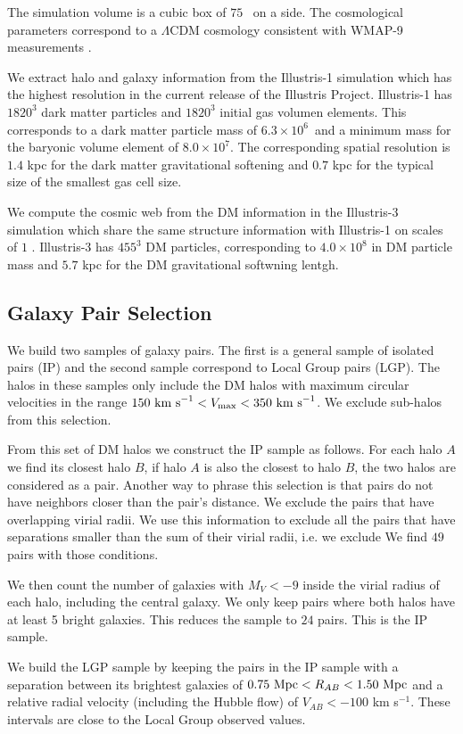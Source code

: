 \documentclass[useAMS,usenatbib,usegraphicx]{mn2e}
\newcommand{\hMpc}{{\ifmmode{h^{-1}{\rm Mpc}}\else{$h^{-1}$Mpc}\fi}}
\newcommand{\Mpc}{{\ifmmode{{\rm Mpc}}\else{Mpc}\fi}}
\newcommand{\Msun}{{\ifmmode{{\rm{M_{\odot}}}}\else{${\rm{M_{\odot}}}$}\fi}}
\newcommand{\kms}{{\ifmmode{{\rm{km\ s}^{-1}}}\else{km $\rm{s}^{-1}$}\fi}}
\begin{document}
The simulation volume is a cubic box of $75$ \hMpc\ on a side.
The cosmological parameters correspond to a $\Lambda$CDM cosmology
consistent with WMAP-9 measurements \citep{2013ApJS..208...19H}. 

We extract halo and galaxy information from the Illustris-1 simulation
which has the highest resolution in the current release of the
Illustris Project.
Illustris-1 has $1820^3$ dark matter particles and $1820^3$ initial gas
volumen elements. 
This corresponds to a dark matter particle mass of
$6.3\times 10^6$\Msun\ and a minimum mass for the baryonic volume
element of $8.0\times 10^7$\Msun. 
The corresponding spatial resolution is $1.4$ kpc for the dark matter
gravitational softening and $0.7$ kpc for the typical size of the
smallest gas cell size. 

We compute the cosmic web from the DM information in the
Illustris-3 simulation which share the same structure information with
Illustris-1 on scales of $1$ \Mpc.  
Illustris-3 has $455^3$ DM particles, corresponding to
$4.0\times 10^8$ \Msun in DM particle mass and $5.7$ kpc for the DM
gravitational softwning lentgh.
 

\subsection{Galaxy Pair Selection}

We build two samples of galaxy pairs. 
The first is a general sample of isolated pairs (IP) and the
second sample correspond to Local Group pairs (LGP).
The halos in these samples only include the DM halos with maximum
circular velocities in the range $ 150\ \kms <V_{\rm max}< 350\ \kms$. We
exclude sub-halos from this selection. 

From this set of DM halos we construct the IP sample as follows.
For each halo $A$ we find its closest halo $B$, if halo $A$ is also
the closest to halo $B$, the two halos are considered as a pair. 
Another way to phrase this selection is that pairs do not have
neighbors closer than the pair's distance.
We exclude the pairs that have overlapping virial radii. 
We use this information to exclude all the pairs that have separations
smaller than the sum of their virial radii, i.e. we exclude
We find $49$ pairs with those conditions.

We then count the number of galaxies with $M_V<-9$ inside the virial
radius of each halo, including the central galaxy.
We only keep pairs where both halos have at least 5 bright galaxies. 
This reduces the sample to $24$ pairs.  
This is the IP sample.

We build the LGP sample by keeping the pairs in the IP sample with
a separation between its brightest galaxies of $0.75\ \Mpc <R_{AB}< 1.50\ \Mpc$
and a relative radial velocity (including the Hubble flow) of $V_{AB}<-100$ km s$^{-1}$.
These intervals are close to the Local Group observed values.




\end{document}
